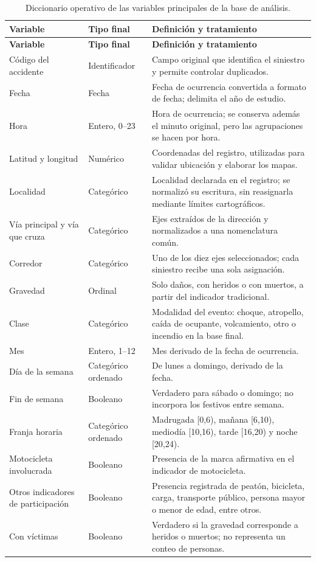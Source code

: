 \documentclass[12pt,letterpaper]{article}
\begin{document}
\begingroup
\begin{longtable}{@{}L{0.25}L{0.18}L{0.57}@{}}
\caption{Diccionario operativo de las variables principales de la base de análisis.}\label{tab:diccionario-oe1}\\
\toprule
\textbf{Variable} & \textbf{Tipo final} & \textbf{Definición y tratamiento}\\
\midrule
\endfirsthead
\toprule
\textbf{Variable} & \textbf{Tipo final} & \textbf{Definición y tratamiento}\\
\midrule
\endhead
Código del accidente & Identificador & Campo original que identifica el siniestro y permite controlar duplicados.\\
Fecha & Fecha & Fecha de ocurrencia convertida a formato de fecha; delimita el año de estudio.\\
Hora & Entero, 0--23 & Hora de ocurrencia; se conserva además el minuto original, pero las agrupaciones se hacen por hora.\\
Latitud y longitud & Numérico & Coordenadas del registro, utilizadas para validar ubicación y elaborar los mapas.\\
Localidad & Categórico & Localidad declarada en el registro; se normalizó su escritura, sin reasignarla mediante límites cartográficos.\\
Vía principal y vía que cruza & Categórico & Ejes extraídos de la dirección y normalizados a una nomenclatura común.\\
Corredor & Categórico & Uno de los diez ejes seleccionados; cada siniestro recibe una sola asignación.\\
Gravedad & Ordinal & Solo daños, con heridos o con muertos, a partir del indicador tradicional.\\
Clase & Categórico & Modalidad del evento: choque, atropello, caída de ocupante, volcamiento, otro o incendio en la base final.\\
Mes & Entero, 1--12 & Mes derivado de la fecha de ocurrencia.\\
Día de la semana & Categórico ordenado & De lunes a domingo, derivado de la fecha.\\
Fin de semana & Booleano & Verdadero para sábado o domingo; no incorpora los festivos entre semana.\\
Franja horaria & Categórico ordenado & Madrugada [0,6), mañana [6,10), mediodía [10,16), tarde [16,20) y noche [20,24).\\
Motocicleta involucrada & Booleano & Presencia de la marca afirmativa en el indicador de motocicleta.\\
Otros indicadores de participación & Booleano & Presencia registrada de peatón, bicicleta, carga, transporte público, persona mayor o menor de edad, entre otros.\\
Con víctimas & Booleano & Verdadero si la gravedad corresponde a heridos o muertos; no representa un conteo de personas.\\
\bottomrule
\end{longtable}
\endgroup
\end{document}

